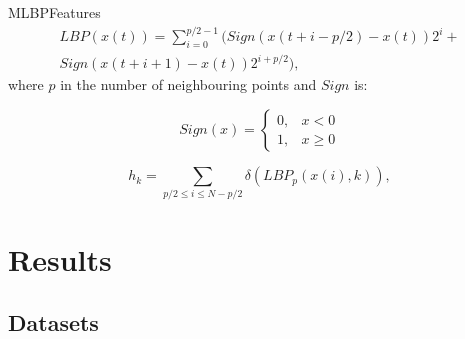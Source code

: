 \documentclass[10pt]{beamer}
\newcommand{\1}{
	\setbeamertemplate{background}{
		\texttt{[image: img/1]}
		\tikz[overlay] \fill[fill opacity=0.75,fill=white] (0,0) rectangle (-\paperwidth,\paperheight);
	}
}
\begin{document}
\begin{frame}{MLBP}{Features}
	\begin{equation} \label{eq:mlbp}
	\begin{split}
	LBP(x(t)) =  \sum_{i=0}^{p/2 - 1} ( Sign ( x(t+i - p/2) - x(t) )2^i +  \\
	Sign( x(t+i+1) - x(t) )2^{i+p/2}  ),
	\end{split}
	\end{equation}		
	where $p$ in the number of neighbouring points and $Sign$ is:
	
	\begin{equation} \label{eq:sign}
	Sign(x) =   
	\begin{cases}
	0, & x < 0 \\
	1, & x \geq 0
	\end{cases}
	\end{equation}
	
	\begin{equation} \label{eq:kro}
	h_k = \sum_{ p/2 \leq i \leq N - p/2} \delta (LBP_p( x(i), k ) ),
	\end{equation}
\end{frame}




\section{Results}

\subsection{Datasets}
\end{document}
